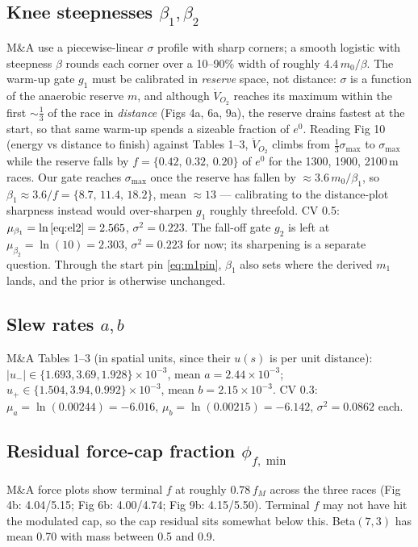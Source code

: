 \documentclass[11pt]{article}
\begin{document}
\subsection*{Knee steepnesses $\beta_1, \beta_2$}
M\&A use a piecewise-linear $\sigma$ profile with sharp corners; a smooth logistic with steepness $\beta$ rounds each corner over a 10--90\% width of roughly $4.4\,m_0/\beta$. The warm-up gate $g_1$ must be calibrated in \emph{reserve} space, not distance: $\sigma$ is a function of the anaerobic reserve $m$, and although $\dot V_{O_2}$ reaches its maximum within the first $\sim\!\tfrac13$ of the race in \emph{distance} (Figs 4a, 6a, 9a), the reserve drains fastest at the start, so that same warm-up spends a sizeable fraction of $e^0$. Reading Fig 10 (energy vs distance to finish) against Tables 1--3, $\dot V_{O_2}$ climbs from $\tfrac13\sigma_{\max}$ to $\sigma_{\max}$ while the reserve falls by $f = \{0.42,\, 0.32,\, 0.20\}$ of $e^0$ for the 1300, 1900, 2100\,m races. Our gate reaches $\sigma_{\max}$ once the reserve has fallen by $\approx 3.6\,m_0/\beta_1$, so $\beta_1 \approx 3.6/f = \{8.7,\, 11.4,\, 18.2\}$, mean $\approx 13$ --- calibrating to the distance-plot sharpness instead would over-sharpen $g_1$ roughly threefold. CV 0.5: $\mu_{\beta_1} = \ln\eqref{eq:el2} = 2.565$, $\sigma^2 = 0.223$. The fall-off gate $g_2$ is left at $\mu_{\beta_2} = \ln(10) = 2.303$, $\sigma^2 = 0.223$ for now; its sharpening is a separate question. Through the start pin \eqref{eq:m1pin}, $\beta_1$ also sets where the derived $m_1$ lands, and the prior is otherwise unchanged.

\subsection*{Slew rates $a, b$}
M\&A Tables 1–3 (in spatial units, since their $u(s)$ is per unit distance): $\lvert u_-\rvert \in \{1.693, 3.69, 1.928\} \times 10^{-3}$, mean $a = 2.44 \times 10^{-3}$; $u_+ \in \{1.504, 3.94, 0.992\} \times 10^{-3}$, mean $b = 2.15 \times 10^{-3}$. CV 0.3: $\mu_a = \ln(0.00244) = -6.016$, $\mu_b = \ln(0.00215) = -6.142$, $\sigma^2 = 0.0862$ each.

\subsection*{Residual force-cap fraction $\phi_{f,\min}$}
M\&A force plots show terminal $f$ at roughly $0.78\, f_M$ across the three races (Fig 4b: 4.04/5.15; Fig 6b: 4.00/4.74; Fig 9b: 4.15/5.50). Terminal $f$ may not have hit the modulated cap, so the cap residual sits somewhat below this. Beta$(7, 3)$ has mean 0.70 with mass between 0.5 and 0.9.
\end{document}
